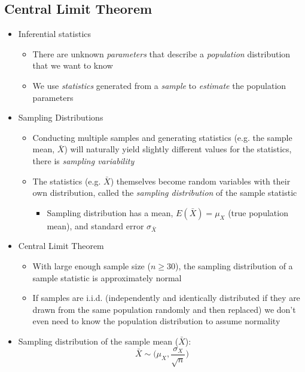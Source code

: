 \documentclass{article}
\begin{document}
\begin{itemize}
\clearpage 

\section{Central Limit Theorem}
	\begin{itemize}
		\item Inferential statistics
		\begin{itemize}
			\item There are unknown \emph{parameters} that describe a \emph{population} distribution that we want to know 
			\item We use \emph{statistics} generated from a \emph{sample} to \emph{estimate} the population parameters
		\end{itemize}	
		\item Sampling Distributions 
		\begin{itemize}
			\item Conducting multiple samples and generating statistics (e.g. the sample mean, $\bar{X}$) will naturally yield slightly different values for the statistics, there is \emph{sampling variability} 
			\item The statistics (e.g. $\bar{X}$) themselves become random variables with their own distribution, called the \emph{sampling distribution} of the sample statistic
			\begin{itemize}
				\item Sampling distribution has a mean, $E(\bar{X})=\mu_X$ (true population mean), and standard error $\sigma_{\bar{X}}$	
			\end{itemize}
		\end{itemize} 
		\item Central Limit Theorem 
			\begin{itemize}
				\item With large enough sample size ($n\geq30$), the sampling distribution of a sample statistic is approximately normal 
				\item If samples are i.i.d. (independently and identically distributed if they are drawn from the same population randomly and then replaced) we don't even need to know the population distribution to assume normality
			\end{itemize} 
		\item Sampling distribution of the sample mean ($\bar{X}$): 
				\begin{equation*}
				\bar{X} \sim \bigg(\mu_X, \frac{\sigma_X}{\sqrt{n}}\bigg)
				\end{equation*}

\end{itemize}
\end{itemize}
\end{document}
